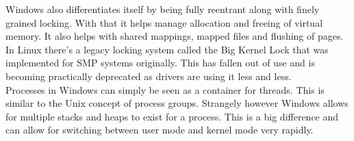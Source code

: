 \documentclass[letterpaper,10pt,draftclsnofoot,onecolumn]{IEEEtran}
\begin{document}
Windows also differentiates itself by being fully reentrant along with finely grained locking. With that it helps manage allocation and freeing of virtual memory. It also helps with shared mappings, mapped files and flushing of pages. In Linux there's a legacy locking system called the Big Kernel Lock that was implemented for SMP systems originally. This has fallen out of use and is becoming practically deprecated as drivers are using it less and less. \cite{love} \\

Processes in Windows can simply be seen as a container for threads. This is similar to the Unix concept of process groups. Strangely however Windows allows for multiple stacks and heaps to exist for a process. This is a big difference and can allow for switching between user mode and kernel mode very rapidly. \\



\end{document}
